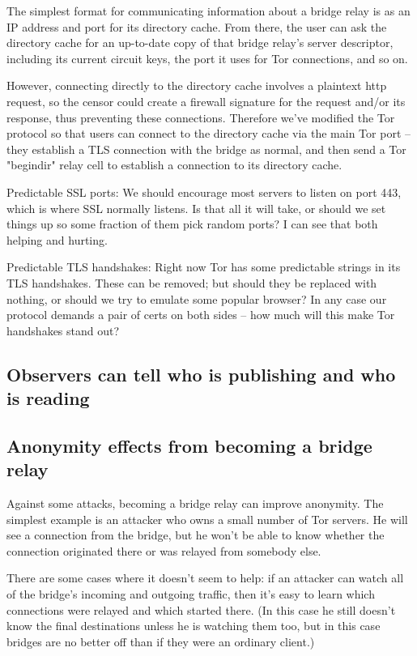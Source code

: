\documentclass{llncs}
\begin{document}
The simplest format for communicating information about a bridge relay
is as an IP address and port for its directory cache. From there, the
user can ask the directory cache for an up-to-date copy of that bridge
relay's server descriptor, including its current circuit keys, the port
it uses for Tor connections, and so on.

However, connecting directly to the directory cache involves a plaintext
http request, so the censor could create a firewall signature for the
request and/or its response, thus preventing these connections. Therefore
we've modified the Tor protocol so that users can connect to the directory
cache via the main Tor port -- they establish a TLS connection with
the bridge as normal, and then send a Tor "begindir" relay cell to
establish a connection to its directory cache.

Predictable SSL ports:
We should encourage most servers to listen on port 443, which is
where SSL normally listens.
Is that all it will take, or should we set things up so some fraction
of them pick random ports? I can see that both helping and hurting.

Predictable TLS handshakes:
Right now Tor has some predictable strings in its TLS handshakes.
These can be removed; but should they be replaced with nothing, or
should we try to emulate some popular browser? In any case our
protocol demands a pair of certs on both sides -- how much will this
make Tor handshakes stand out?

\subsection{Observers can tell who is publishing and who is reading}
\label{subsec:upload-padding}



\subsection{Anonymity effects from becoming a bridge relay}

Against some attacks, becoming a bridge relay can improve anonymity. The
simplest example is an attacker who owns a small number of Tor servers. He
will see a connection from the bridge, but he won't be able to know
whether the connection originated there or was relayed from somebody else.

There are some cases where it doesn't seem to help: if an attacker can
watch all of the bridge's incoming and outgoing traffic, then it's easy
to learn which connections were relayed and which started there. (In this
case he still doesn't know the final destinations unless he is watching
them too, but in this case bridges are no better off than if they were
an ordinary client.)
\end{document}
